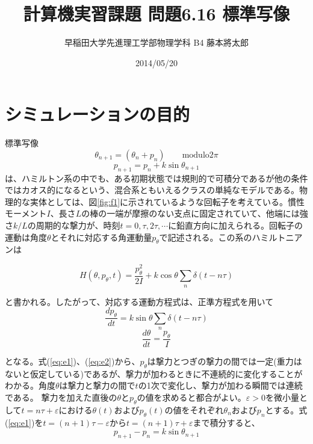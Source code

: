 \documentclass{jsarticle}
\title{計算機実習課題 問題6.16 標準写像}
\author{早稲田大学先進理工学部物理学科 B4 藤本將太郎}
\date{2014/05/20}
\begin{document}
\maketitle
    
    \section{シミュレーションの目的}
        標準写像
        \begin{equation}
            \theta_{n+1} = (\theta_{n} + p_{n}) \qquad \mathrm{modulo} 2\pi
            \label{eq:s1}
        \end{equation}
        \begin{equation}
            p_{n+1} = p_{n} + k \sin \theta_{n+1}
            \label{eq:s2}
        \end{equation}
        は、ハミルトン系の中でも、ある初期状態では規則的で可積分であるが他の条件ではカオス的になるという、混合系ともいえるクラスの単純なモデルである。物理的な実体としては、図\ref{fig:f1}に示されているような回転子を考えている。慣性モーメント$I$、長さ$L$の棒の一端が摩擦のない支点に固定されていて、他端には強さ$k/L$の周期的な撃力が、時刻$t=0,\tau,2\tau, \cdots $に鉛直方向に加えられる。回転子の運動は角度$\theta$とそれに対応する角運動量$p_{\theta}$で記述される。この系のハミルトニアンは
        
        \begin{equation}
            H(\theta, p_{\theta}, t) = \frac{p_{\theta}^{2}}{2I} + k \cos \theta \sum_{n} \delta (t-n\tau)
        \end{equation}
        
        と書かれる。したがって、対応する運動方程式は、正準方程式を用いて
        \begin{equation}
            \frac{dp_{\theta}}{dt} = k\sin \theta \sum_{n} \delta (t- n\tau)
            \label{eq:e1}
        \end{equation}
        \begin{equation}
            \frac{d\theta}{dt} = \frac{p_{\theta}}{I}
            \label{eq:e2}
        \end{equation}

        となる。式(\ref{eq:e1})、(\ref{eq:e2})から、$p_{\theta}$は撃力とつぎの撃力の間では一定(重力はないと仮定している)であるが、撃力が加わるときに不連続的に変化することがわかる。角度$\theta$は撃力と撃力の間で$t$の1次で変化し、撃力が加わる瞬間では連続である。
        撃力を加えた直後の$\theta$と$p_{\theta}$の値を求めると都合がよい。$\varepsilon>0$を微小量として$t=n\tau + \varepsilon$における$\theta(t)$および$p_{\theta}(t)$の値をそれぞれ$\theta_{n}$および$p_{n}$とする。式(\ref{eq:e1})を$t=(n+1)\tau-\varepsilon$から$t=(n+1)\tau+\varepsilon$まで積分すると、
        \begin{equation}
            p_{n+1} - p_{n}= k\sin \theta_{n+1}
        \end{equation}
\end{document}
